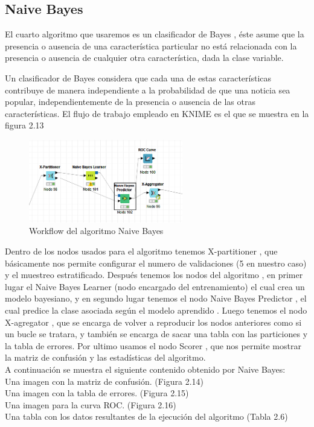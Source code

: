 	\subsection{Naive Bayes}

	El cuarto algoritmo que usaremos es un clasificador de Bayes \cite{Wikipedia1}, éste asume que la presencia o ausencia de una característica
	particular no está relacionada con la presencia o ausencia de cualquier otra característica, dada la clase variable.
	
	\vspace{1mm}

	Un clasificador de Bayes considera que cada una de estas características contribuye de manera independiente a la probabilidad 
	de que una noticia sea popular, independientemente de la presencia o ausencia de las otras características.
	El flujo de trabajo empleado en KNIME es el que se muestra en la figura 2.13

	\begin{figure}[htb]
		\centering
		\includegraphics[width=0.6\textwidth]{./imagenes/18}
		\caption{Workflow del algoritmo Naive Bayes} \label{fig:1}
	\end{figure}

	Dentro de los nodos usados para el algoritmo tenemos X-partitioner , que básicamente nos permite configurar el numero de validaciones
	(5 en nuestro caso) y el muestreo estratificado. Después tenemos los nodos del algoritmo , en primer lugar el Naive Bayes Learner (nodo encargado del entrenamiento)
	el cual crea un modelo bayesiano, y en segundo lugar tenemos el nodo Naive Bayes Predictor , el cual predice la clase asociada
	según el modelo aprendido . Luego tenemos el nodo X-agregator  , que se encarga de volver a reproducir los nodos anteriores como si un bucle se tratara,
	y también se encarga de sacar una tabla con las particiones y la tabla de errores. Por ultimo usamos el nodo Scorer , que nos permite mostrar la matriz de confusión y las estadísticas del algoritmo. \\

	A continuación se muestra el siguiente contenido obtenido por Naive Bayes:	\\
	Una imagen con la matriz de confusión. (Figura 2.14) \\
	Una imagen con la tabla de errores. (Figura 2.15) \\
	Una imagen para la curva ROC. (Figura 2.16)	\\
	Una tabla con los datos resultantes de la ejecución del algoritmo (Tabla 2.6)\\

